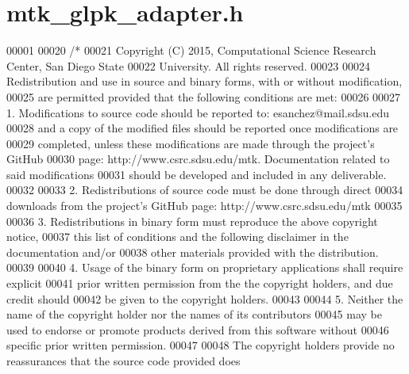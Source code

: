 \hypertarget{mtk__glpk__adapter_8h_source}{\section{mtk\+\_\+glpk\+\_\+adapter.\+h}
\label{mtk__glpk__adapter_8h_source}
}

\begin{DoxyCode}
00001 
00020 \textcolor{comment}{/*}
00021 \textcolor{comment}{Copyright (C) 2015, Computational Science Research Center, San Diego State}
00022 \textcolor{comment}{University. All rights reserved.}
00023 \textcolor{comment}{}
00024 \textcolor{comment}{Redistribution and use in source and binary forms, with or without modification,}
00025 \textcolor{comment}{are permitted provided that the following conditions are met:}
00026 \textcolor{comment}{}
00027 \textcolor{comment}{1. Modifications to source code should be reported to: esanchez@mail.sdsu.edu}
00028 \textcolor{comment}{and a copy of the modified files should be reported once modifications are}
00029 \textcolor{comment}{completed, unless these modifications are made through the project's GitHub}
00030 \textcolor{comment}{page: http://www.csrc.sdsu.edu/mtk. Documentation related to said modifications}
00031 \textcolor{comment}{should be developed and included in any deliverable.}
00032 \textcolor{comment}{}
00033 \textcolor{comment}{2. Redistributions of source code must be done through direct}
00034 \textcolor{comment}{downloads from the project's GitHub page: http://www.csrc.sdsu.edu/mtk}
00035 \textcolor{comment}{}
00036 \textcolor{comment}{3. Redistributions in binary form must reproduce the above copyright notice,}
00037 \textcolor{comment}{this list of conditions and the following disclaimer in the documentation and/or}
00038 \textcolor{comment}{other materials provided with the distribution.}
00039 \textcolor{comment}{}
00040 \textcolor{comment}{4. Usage of the binary form on proprietary applications shall require explicit}
00041 \textcolor{comment}{prior written permission from the the copyright holders, and due credit should}
00042 \textcolor{comment}{be given to the copyright holders.}
00043 \textcolor{comment}{}
00044 \textcolor{comment}{5. Neither the name of the copyright holder nor the names of its contributors}
00045 \textcolor{comment}{may be used to endorse or promote products derived from this software without}
00046 \textcolor{comment}{specific prior written permission.}
00047 \textcolor{comment}{}
00048 \textcolor{comment}{The copyright holders provide no reassurances that the source code provided does}

\end{DoxyCode}
